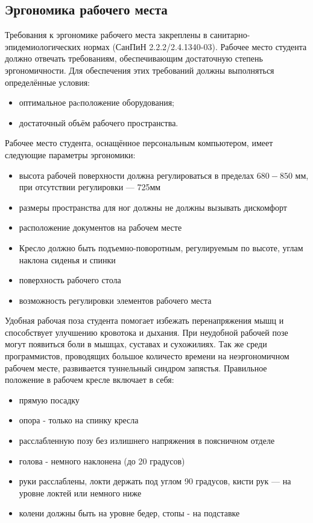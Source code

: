 \subsection{Эргономика рабочего места}

\label{erg}

Требования к эргономике рабочего места закреплены в санитарно-эпиде\-миологических нормах (СанПиН 2.2.2/2.4.1340-03). Рабочее место студента должно отвечать требованиям, обеспечивающим достаточную степень эрго\-номичности. Для обеспечения этих требований должны выполняться опре\-делённые условия: 
\begin{itemize}
\item оптимальное раcположение оборудования;
\item достаточный объём рабочего пространства.
\end{itemize}

Рабочее место студента, оснащённое персональным компьютером, имеет следующие параметры эргономики: 
\begin{itemize}
\item высота рабочей поверхности должна регулироваться в пределах $680-850$ мм, при отсутствии регулировки — 725мм
\item размеры пространства для ног должны не должны вызывать диском\-форт
\item расположение документов на рабочем месте
\item Кресло должно быть подъемно-поворотным, регулируемым по высоте, углам наклона сиденья и спинки
\item поверхность рабочего стола
\item возможность регулировки элементов рабочего места
\end{itemize}

Удобная рабочая поза студента помогает избежать перенапряжения мышц и спо\-собствует улучшению кровотока и дыхания. При неудобной рабочей позе могут появиться боли в мышцах, суставах и сухожилиях. Так же среди программистов, проводящих большое количесто времени на неэргономичном рабочем месте, развивается туннельный синдром запястья.
Правильное по\-ложение в рабочем кресле включает в себя:
\begin{itemize}
\item прямую посадку
\item опора - только на спинку кресла
\item расслабленную позу без излишнего напряжения в поясничном отделе
\item голова  - немного наклонена (до 20 градусов)
\item руки расслаблены, локти держать под углом 90 градусов, кисти рук — на уровне локтей или немного ниже
\item колени должны быть на уровне бедер, стопы - на подставке
\end{itemize}

